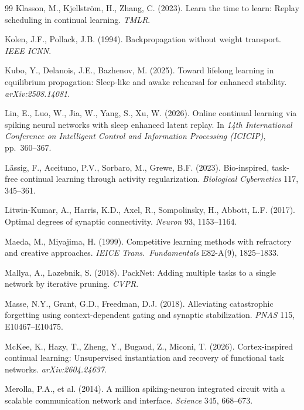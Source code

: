 \documentclass{article}
\begin{document}
\begin{thebibliography}{99}
 Klasson, M., Kjellstr\"om, H., Zhang, C. (2023). Learn the time to learn: Replay scheduling in continual learning. \emph{TMLR}.

 Kolen, J.F., Pollack, J.B. (1994). Backpropagation without weight transport. \emph{IEEE ICNN}.

 Kubo, Y., Delanois, J.E., Bazhenov, M. (2025). Toward lifelong learning in equilibrium propagation: Sleep-like and awake rehearsal for enhanced stability. \emph{arXiv:2508.14081}.

 Lin, E., Luo, W., Jia, W., Yang, S., Xu, W. (2026). Online continual learning via spiking neural networks with sleep enhanced latent replay. In \emph{14th International Conference on Intelligent Control and Information Processing (ICICIP)}, pp.\ 360--367.

 L\"assig, F., Aceituno, P.V., Sorbaro, M., Grewe, B.F. (2023). Bio-inspired, task-free continual learning through activity regularization. \emph{Biological Cybernetics} 117, 345--361.

 Litwin-Kumar, A., Harris, K.D., Axel, R., Sompolinsky, H., Abbott, L.F. (2017). Optimal degrees of synaptic connectivity. \emph{Neuron} 93, 1153--1164.

 Maeda, M., Miyajima, H. (1999). Competitive learning methods with refractory and creative approaches. \emph{IEICE Trans.\ Fundamentals} E82-A(9), 1825--1833.

 Mallya, A., Lazebnik, S. (2018). PackNet: Adding multiple tasks to a single network by iterative pruning. \emph{CVPR}.

 Masse, N.Y., Grant, G.D., Freedman, D.J. (2018). Alleviating catastrophic forgetting using context-dependent gating and synaptic stabilization. \emph{PNAS} 115, E10467--E10475.

 McKee, K., Hazy, T., Zheng, Y., Bugaud, Z., Miconi, T. (2026). Cortex-inspired continual learning: Unsupervised instantiation and recovery of functional task networks. \emph{arXiv:2604.24637}.

 Merolla, P.A., et al. (2014). A million spiking-neuron integrated circuit with a scalable communication network and interface. \emph{Science} 345, 668--673.


\end{thebibliography}
\end{document}
